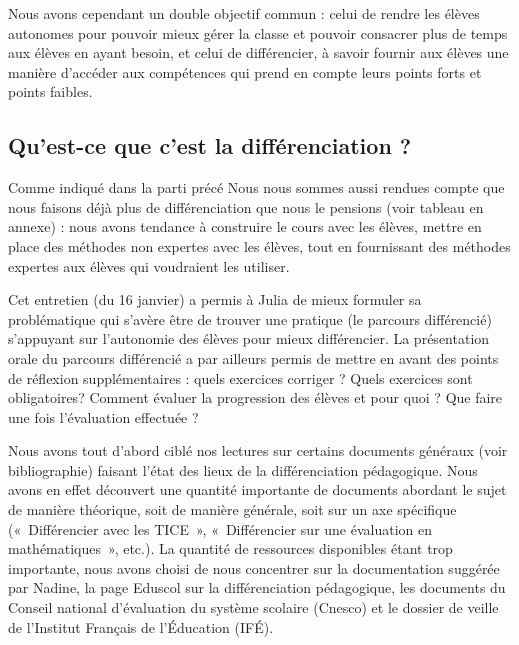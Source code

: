   Nous avons cependant un double objectif commun : celui de rendre les élèves autonomes pour pouvoir mieux gérer la classe et pouvoir consacrer plus de temps aux élèves en ayant besoin, et celui de différencier, à savoir fournir aux élèves une manière d’accéder aux compétences qui prend en compte leurs points forts et points faibles.


\subsection{Qu'est-ce que c'est la différenciation ?}
Comme indiqué dans la parti précé
Nous nous sommes aussi rendues compte que nous faisons déjà plus de différenciation que nous le pensions (voir tableau en annexe) : nous avons tendance à construire le cours avec les élèves, mettre en place des méthodes non expertes avec les élèves, tout en fournissant des méthodes expertes aux élèves qui voudraient les utiliser.



Cet entretien (du 16 janvier) a permis à Julia de mieux formuler sa problématique qui s’avère être de trouver une pratique (le parcours différencié) s’appuyant sur l’autonomie des élèves pour mieux différencier. La présentation orale du parcours différencié a par ailleurs permis de mettre en avant des points de réflexion supplémentaires : quels exercices corriger ? Quels exercices sont obligatoires? Comment évaluer la progression des élèves et pour quoi ? Que faire une fois l’évaluation effectuée ?

Nous avons tout d’abord ciblé nos lectures sur certains documents généraux (voir bibliographie) faisant l’état des lieux de la différenciation pédagogique. Nous avons en effet découvert une quantité importante de documents abordant le sujet de manière théorique, soit de manière générale, soit sur un axe spécifique (« Différencier avec les TICE », « Différencier sur une évaluation en mathématiques », etc.). La quantité de ressources disponibles étant trop importante, nous avons choisi de nous concentrer sur la documentation suggérée par Nadine, la page Eduscol sur la différenciation pédagogique, les documents du Conseil national d’évaluation du système scolaire (Cnesco) et le dossier de veille de l’Institut Français de l’Éducation (IFÉ).

